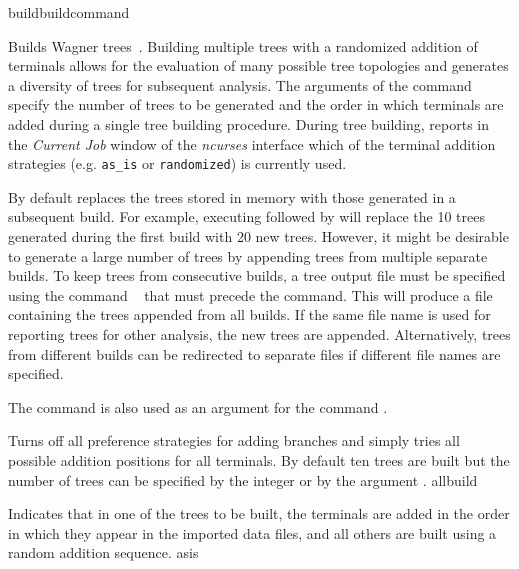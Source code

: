 
\begin{command}{build}{buildcommand}


\begin{poydescription}
Builds Wagner trees~\cite{farris1970}. Building multiple trees with 
a randomized addition of terminals allows for the evaluation of
many possible tree topologies and generates a diversity of
trees for subsequent analysis. The arguments of the command
 specify the number of trees to be generated and
the order in which terminals are added during a single tree building
procedure. During tree building, \poy reports in the \emph{Current
Job} window of the \emph{ncurses} interface which of the terminal
addition strategies (e.g. \texttt{as\_is} or \texttt{randomized})
is currently used.

By default \poy replaces the trees stored in memory with those 
generated in a subsequent build. For example, executing
 followed by  will
replace the 10 trees generated during the first build with 20 new
trees. However, it might be desirable to generate a large number
of trees by appending trees from multiple separate builds. To keep
trees from consecutive builds, a tree output file must be specified
using the command ~ that must precede the
 command. This will produce a file containing the
trees appended from all builds. If the same file name is used for 
reporting trees for other analysis, the new trees are appended. 
Alternatively, trees from different builds can be redirected
to separate files if different file names are specified.

The command  is also used as
an argument for the command .
\end{poydescription}

\begin{arguments}

{Turns off all preference strategies for adding branches
and simply tries all possible addition positions for
all terminals. By default ten trees are built but the number 
of trees can be specified by the integer or by the argument 
.}
{allbuild}

{Indicates that in one of the trees to be built, the terminals are
added in the order in which they appear in the imported data files,
and all others are built using a random addition sequence.}
{asis}


\end{arguments}
\end{command}
